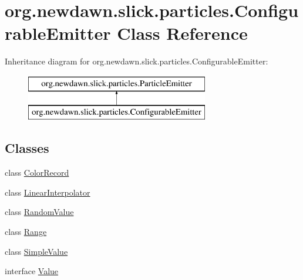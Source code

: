 \hypertarget{classorg_1_1newdawn_1_1slick_1_1particles_1_1_configurable_emitter}{}\section{org.\+newdawn.\+slick.\+particles.\+Configurable\+Emitter Class Reference}
\label{classorg_1_1newdawn_1_1slick_1_1particles_1_1_configurable_emitter}
Inheritance diagram for org.\+newdawn.\+slick.\+particles.\+Configurable\+Emitter\+:\begin{figure}[H]
\begin{center}
\leavevmode
\includegraphics[height=2.000000cm]{classorg_1_1newdawn_1_1slick_1_1particles_1_1_configurable_emitter}
\end{center}
\end{figure}
\subsection*{Classes}
\begin{DoxyCompactItemize}
\item 
class \mbox{\hyperlink{classorg_1_1newdawn_1_1slick_1_1particles_1_1_configurable_emitter_1_1_color_record}{Color\+Record}}
\item 
class \mbox{\hyperlink{classorg_1_1newdawn_1_1slick_1_1particles_1_1_configurable_emitter_1_1_linear_interpolator}{Linear\+Interpolator}}
\item 
class \mbox{\hyperlink{classorg_1_1newdawn_1_1slick_1_1particles_1_1_configurable_emitter_1_1_random_value}{Random\+Value}}
\item 
class \mbox{\hyperlink{classorg_1_1newdawn_1_1slick_1_1particles_1_1_configurable_emitter_1_1_range}{Range}}
\item 
class \mbox{\hyperlink{classorg_1_1newdawn_1_1slick_1_1particles_1_1_configurable_emitter_1_1_simple_value}{Simple\+Value}}
\item 
interface \mbox{\hyperlink{interfaceorg_1_1newdawn_1_1slick_1_1particles_1_1_configurable_emitter_1_1_value}{Value}}
\end{DoxyCompactItemize}
